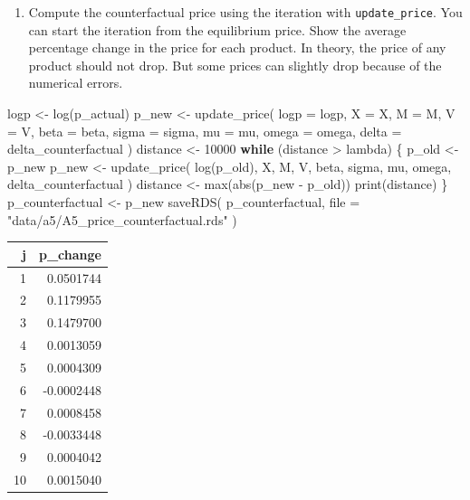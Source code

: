 \documentclass[
]{book}
\newenvironment{Shaded}{\begin{snugshade}}{\end{snugshade}}
\newcommand{\AttributeTok}[1]{\textcolor[rgb]{0.77,0.63,0.00}{#1}}
\newcommand{\ControlFlowTok}[1]{\textcolor[rgb]{0.13,0.29,0.53}{\textbf{#1}}}
\newcommand{\DecValTok}[1]{\textcolor[rgb]{0.00,0.00,0.81}{#1}}
\newcommand{\FunctionTok}[1]{\textcolor[rgb]{0.00,0.00,0.00}{#1}}
\newcommand{\NormalTok}[1]{#1}
\newcommand{\OtherTok}[1]{\textcolor[rgb]{0.56,0.35,0.01}{#1}}
\newcommand{\SpecialCharTok}[1]{\textcolor[rgb]{0.00,0.00,0.00}{#1}}
\newcommand{\StringTok}[1]{\textcolor[rgb]{0.31,0.60,0.02}{#1}}
\providecommand{\tightlist}{%
  \setlength{\itemsep}{0pt}\setlength{\parskip}{0pt}}
\begin{document}
\begin{enumerate}
\def\labelenumi{\arabic{enumi}.}
\setcounter{enumi}{1}
\tightlist
\item
  Compute the counterfactual price using the iteration with \texttt{update\_price}. You can start the iteration from the equilibrium price. Show the average percentage change in the price for each product. In theory, the price of any product should not drop. But some prices can slightly drop because of the numerical errors.
\end{enumerate}

\begin{Shaded}
\begin{Highlighting}[]
\NormalTok{logp }\OtherTok{\textless{}{-}} \FunctionTok{log}\NormalTok{(p\_actual)}
\NormalTok{p\_new }\OtherTok{\textless{}{-}} 
  \FunctionTok{update\_price}\NormalTok{(}
    \AttributeTok{logp =}\NormalTok{ logp, }
    \AttributeTok{X =}\NormalTok{ X, }
    \AttributeTok{M =}\NormalTok{ M, }
    \AttributeTok{V =}\NormalTok{ V, }
    \AttributeTok{beta =}\NormalTok{ beta, }
    \AttributeTok{sigma =}\NormalTok{ sigma, }
    \AttributeTok{mu =}\NormalTok{ mu, }
    \AttributeTok{omega =}\NormalTok{ omega, }
    \AttributeTok{delta =}\NormalTok{ delta\_counterfactual}
\NormalTok{    )}
\NormalTok{distance }\OtherTok{\textless{}{-}} \DecValTok{10000}
\ControlFlowTok{while}\NormalTok{ (distance }\SpecialCharTok{\textgreater{}}\NormalTok{ lambda) \{}
\NormalTok{  p\_old }\OtherTok{\textless{}{-}}\NormalTok{ p\_new}
\NormalTok{  p\_new }\OtherTok{\textless{}{-}} 
    \FunctionTok{update\_price}\NormalTok{(}
      \FunctionTok{log}\NormalTok{(p\_old), }
\NormalTok{      X, }
\NormalTok{      M, }
\NormalTok{      V, }
\NormalTok{      beta, }
\NormalTok{      sigma, }
\NormalTok{      mu, }
\NormalTok{      omega, }
\NormalTok{      delta\_counterfactual}
\NormalTok{      )}
\NormalTok{  distance }\OtherTok{\textless{}{-}} \FunctionTok{max}\NormalTok{(}\FunctionTok{abs}\NormalTok{(p\_new }\SpecialCharTok{{-}}\NormalTok{ p\_old))}
  \FunctionTok{print}\NormalTok{(distance)}
\NormalTok{\}}
\NormalTok{p\_counterfactual }\OtherTok{\textless{}{-}}\NormalTok{ p\_new}
\FunctionTok{saveRDS}\NormalTok{(}
\NormalTok{  p\_counterfactual, }
  \AttributeTok{file =} \StringTok{"data/a5/A5\_price\_counterfactual.rds"}
\NormalTok{  )}
\end{Highlighting}
\end{Shaded}

\begin{tabular}{r|r}
\hline
j & p\_change\\
\hline
1 & 0.0501744\\
\hline
2 & 0.1179955\\
\hline
3 & 0.1479700\\
\hline
4 & 0.0013059\\
\hline
5 & 0.0004309\\
\hline
6 & -0.0002448\\
\hline
7 & 0.0008458\\
\hline
8 & -0.0033448\\
\hline
9 & 0.0004042\\
\hline
10 & 0.0015040\\
\hline
\end{tabular}
\end{document}
